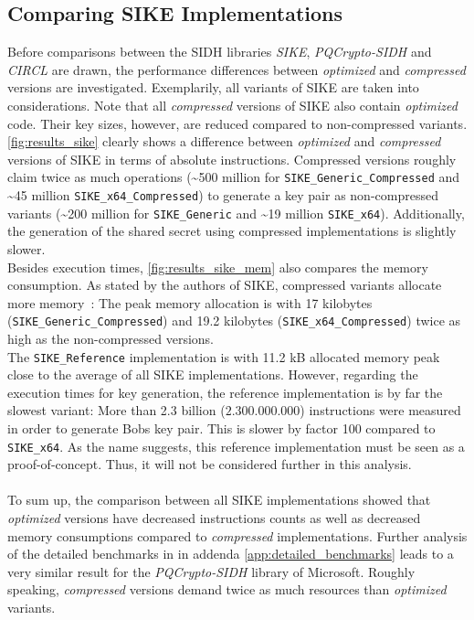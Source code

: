 \subsection{Comparing \gls{SIKE} Implementations}\label{sec:analysis_sike}
Before comparisons between the \gls{SIDH} libraries \textit{SIKE}, \textit{ \gls{PQCrypto-SIDH}} and \textit{\gls{CIRCL}} are drawn, the performance differences between \textit{optimized} and \textit{compressed} versions are investigated. Exemplarily, all variants of \gls{SIKE} are taken into considerations. Note that all \textit{compressed} versions of \gls{SIKE} also contain \textit{optimized} code. Their key sizes, however, are reduced compared to non-compressed variants.
\\
\autoref{fig:results_sike} clearly shows a difference between \textit{optimized} and \textit{compressed} versions of \gls{SIKE} in terms of absolute instructions. Compressed versions roughly claim twice as much operations (\textasciitilde 500 million for \texttt{SIKE\_Generic\_Compressed} and \textasciitilde 45 million \texttt{SIKE\_x64\_Compressed}) to generate a key pair as non-compressed variants (\textasciitilde 200 million for \texttt{SIKE\_Generic} and \textasciitilde 19 million \texttt{SIKE\_x64}). Additionally, the generation of the shared secret  using compressed implementations is slightly slower.\\
Besides execution times, \autoref{fig:results_sike_mem} also compares the memory consumption. As stated by the authors of \gls{SIKE}, compressed variants allocate more memory~\parencite{sike2020spec}: The peak memory allocation is with 17 kilobytes (\texttt{SIKE\_Generic\_Compressed}) and 19.2 kilobytes (\texttt{SIKE\_x64\_Compressed}) twice as high as the non-compressed versions.\\
The \texttt{SIKE\_Reference} implementation is with 11.2 \gls{kB} allocated memory peak close to the average of all \gls{SIKE} implementations. However, regarding the execution times for key generation, the reference implementation is by far the slowest variant: More than 2.3 billion ($2.300.000.000$) instructions were measured in order to generate Bobs key pair. This is slower by factor 100 compared to \texttt{SIKE\_x64}. As the name suggests, this reference implementation must be seen as a proof-of-concept. Thus, it will not be considered further in this analysis.
\\\\
To sum up, the comparison between all \gls{SIKE} implementations showed that \textit{optimized} versions have decreased instructions counts as well as decreased memory consumptions compared to \textit{compressed} implementations. Further analysis of the detailed benchmarks in in addenda \ref{app:detailed_benchmarks} leads to a very similar result for the \textit{ \gls{PQCrypto-SIDH}} library of Microsoft. Roughly speaking, \textit{compressed} versions demand twice as much resources than \textit{optimized} variants.


